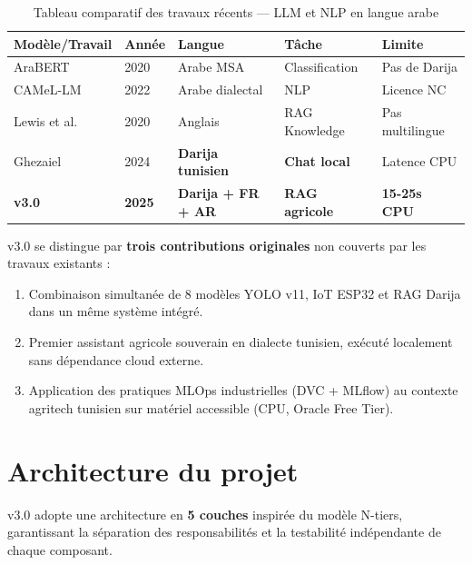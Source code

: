 \begin{table}[H]\centering
\caption{Tableau comparatif des travaux récents — LLM et NLP en langue arabe}
\label{tab:art_llm}
\small
\begin{tabular}{p{3.5cm}p{2cm}p{2.5cm}p{3cm}p{2.5cm}}
\toprule
\textbf{Modèle/Travail} & \textbf{Année} & \textbf{Langue} & \textbf{Tâche} & \textbf{Limite} \\
\midrule
AraBERT & 2020 & Arabe MSA & Classification & Pas de Darija \\
CAMeL-LM & 2022 & Arabe dialectal & NLP & Licence NC \\
Lewis et al. \cite{lewis2020rag} & 2020 & Anglais & RAG Knowledge & Pas multilingue \\
Ghezaiel \cite{labess7b} & 2024 & \textbf{Darija tunisien} & \textbf{Chat local} & Latence CPU \\
\textbf{\farmAI{} v3.0} & \textbf{2025} & \textbf{Darija + FR + AR} & \textbf{RAG agricole} & \textbf{15-25s CPU} \\
\bottomrule
\end{tabular}
\end{table}

\begin{tcolorbox}[infobox, title={Positionnement de \farmAI{} dans la littérature}]
\farmAI{} v3.0 se distingue par \textbf{trois contributions originales} non couverts
par les travaux existants :
\begin{enumerate}
  \item Combinaison simultanée de 8 modèles YOLO v11, IoT ESP32 et RAG Darija dans
        un même système intégré.
  \item Premier assistant agricole souverain en dialecte tunisien, exécuté localement
        sans dépendance cloud externe.
  \item Application des pratiques MLOps industrielles (DVC + MLflow) au contexte
        agritech tunisien sur matériel accessible (CPU, Oracle Free Tier).
\end{enumerate}
\end{tcolorbox}

\section{Architecture du projet}

\farmAI{} v3.0 adopte une architecture en \textbf{5 couches} inspirée du modèle
N-tiers, garantissant la séparation des responsabilités et la testabilité indépendante
de chaque composant.


